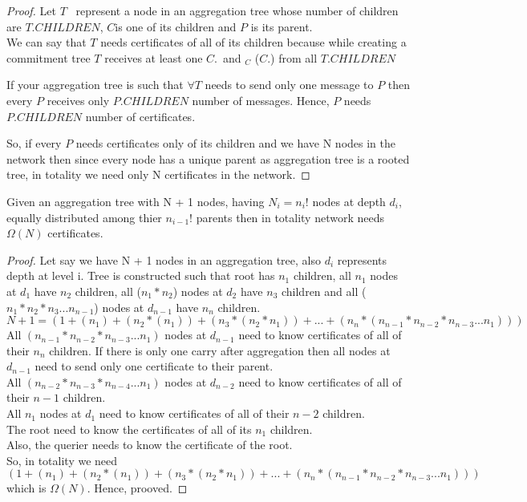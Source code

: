 \begin{proof}
	
	Let $T$ \ represent a node in an aggregation tree whose number of children are $T$.$CHILDREN$, $C$is one of its children and $P$ is its parent.\\
	We can say that $T$ needs certificates of all of its children because while creating a commitment tree $T$ receives at least one $C$.\msg \ and \sign$_{C}$ ($C$.\msg)  from all $T$.$CHILDREN$

	If your aggregation tree is such that $\forall T$ needs to send only one message to $P$ then every $P$ receives only $P.CHILDREN$ number of messages. Hence, $P$ needs $P.CHILDREN$ number of certificates.

	So, if every $P$ needs certificates only of its children  and we have N nodes in the network then since every node has a unique parent as aggregation tree is a rooted tree, in totality we need only N certificates in the network.

\end{proof}


\begin{theorem}
		Given an aggregation tree with N + 1 nodes, having $N_{i} = n_{i}!$ nodes at depth $d_{i}$, equally distributed among thier $n_{i-1}!$ parents then in totality network needs $\Omega(N)$ certificates.
\end{theorem}

\begin{proof}

	Let say we have N + 1 nodes in an aggregation tree, also $d_{i}$ represents depth at level i. Tree is constructed such that root has $n_{1}$ children, all $n_{1}$ nodes at $d_{1}$ have $n_{2}$ children, all ($n_{1} * n_{2}$)  nodes at $d_{2}$ have $n_{3}$ children and all ($n_{1} * n_{2} * n_{3} ... n_{n-1}$) nodes at $d_{n-1}$ have $n_{n}$ children.\\
	$ N + 1 = (1 + (n_{1}) + (n_{2} * (n_{1})) + (n_{3} * (n_{2} * n_{1})) + ... + (n_{n} * (n_{n-1} * n_{n-2} * n_{n-3} ... n_{1}) ) ) $\\
	
	All $ (n_{n-1} * n_{n-2} * n_{n-3} ... n_{1}) $ nodes at $ d_{n-1} $ need to know certificates of all of their $n_{n}$ children.
	If there is only one carry after aggregation then all nodes at $d_{n-1}$ need to send only one certificate to their parent.\\
	All $ (n_{n-2} * n_{n-3} * n_{n-4} ... n_{1}) $ nodes at $ d_{n-2} $ need to know certificates of all of their $ n-1 $ children.\\
	All $ n_{1} $ nodes at $ d_{1} $ need to know certificates of all of their $ n-2 $ children.\\
	The root need to know the certificates of all of its $ n_{1} $ children.\\
	Also, the querier needs to know the certificate of the root.\\
	So, in totality we need $ (1 + (n_{1}) + (n_{2} * (n_{1})) + (n_{3} * (n_{2} * n_{1})) + ... + (n_{n} * (n_{n-1} * n_{n-2} * n_{n-3} ... n_{1}) ) ) $ which is $\Omega(N)$. Hence, prooved.

\end{proof}